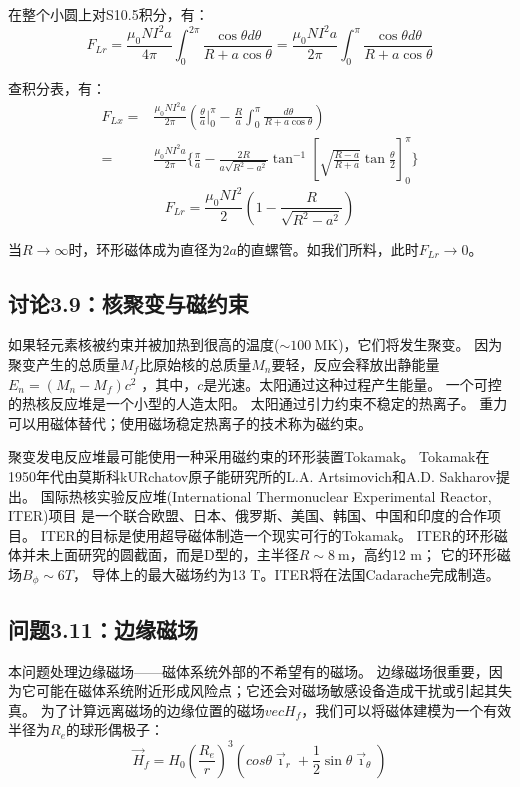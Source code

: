 在整个小圆上对S10.5积分，有：
\begin{equation}
F_{Lr}=\frac{\mu_{0}NI^{2}a}{4\pi}\int_{0}^{2\pi}\frac{\cos\theta d\theta}{R+a\cos\theta}=\frac{\mu_{0}NI^{2}a}{2\pi}\int_{0}^{\pi}\frac{\cos\theta d\theta}{R+a\cos\theta}%
\end{equation}

查积分表，有：
\begin{equation}
\begin{split}
F_{Lx}=&\frac{\mu_{0}NI^{2}a}{2\pi}(\frac{\theta}{a}|_{0}^{\pi}-\frac{R}{a}\int_{0}^{\pi}\frac{d\theta}{R+a\cos\theta})\\
=&\frac{\mu_{0}NI^{2}a}{2\pi}\{\frac{\pi}{a}-\frac{2R}{a\sqrt{R^{2}-a^{2}}}\tan^{-1}[\sqrt{\frac{R-a}{R+a}}\tan\frac{\theta}{2}]_{0}^{\pi}\}%
\end{split}
\end{equation}
\begin{equation}
F_{Lr}=\frac{\mu_{0}NI^{2}}{2}(1-\frac{R}{\sqrt{R^{2}-a^{2}}})%
\end{equation}

当$R\rightarrow \infty$时，环形磁体成为直径为$2a$的直螺管。如我们所料，此时$F_{Lr}\rightarrow 0$。
\newpage


\subsection{讨论3.9：核聚变与磁约束}
如果轻元素核被约束并被加热到很高的温度($\sim 100\ \mathrm{MK}$)，它们将发生聚变。
因为聚变产生的总质量$M_f$比原始核的总质量$M_n$要轻，反应会释放出静能量$E_n =(M_n−M_f)c^2$
，其中，$c$是光速。太阳通过这种过程产生能量。
一个可控的热核反应堆是一个小型的人造太阳。
太阳通过引力约束不稳定的热离子。
重力可以用磁体替代；使用磁场稳定热离子的技术称为磁约束。

聚变发电反应堆最可能使用一种采用磁约束的环形装置Tokamak。
Tokamak在1950年代由莫斯科kURchatov原子能研究所的L.A. Artsimovich和A.D. Sakharov提出。
国际热核实验反应堆(International Thermonuclear Experimental Reactor, ITER)项目
是一个联合欧盟、日本、俄罗斯、美国、韩国、中国和印度的合作项目。
ITER的目标是使用超导磁体制造一个现实可行的Tokamak。
ITER的环形磁体并未上面研究的圆截面，而是D型的，主半径$R\sim 8\ \mathrm{m}$，高约12 m；
它的环形磁场$B_\phi\sim 6 T$，
导体上的最大磁场约为13 T。ITER将在法国Cadarache完成制造。
\newpage


\subsection{问题3.11：边缘磁场}
本问题处理边缘磁场——磁体系统外部的不希望有的磁场。
边缘磁场很重要，因为它可能在磁体系统附近形成风险点；它还会对磁场敏感设备造成干扰或引起其失真。
为了计算远离磁场的边缘位置的磁场$vec{H_f}$，我们可以将磁体建模为一个有效半径为$R_e$的球形偶极子：
\begin{equation}
\vec{H}_{f}=H_{0}(\frac{R_{e}}{r})^{3}(cos\theta\vec{\imath}_{r}+\frac{1}{2}\sin\theta\vec{\imath}_{\theta})
\end{equation}

